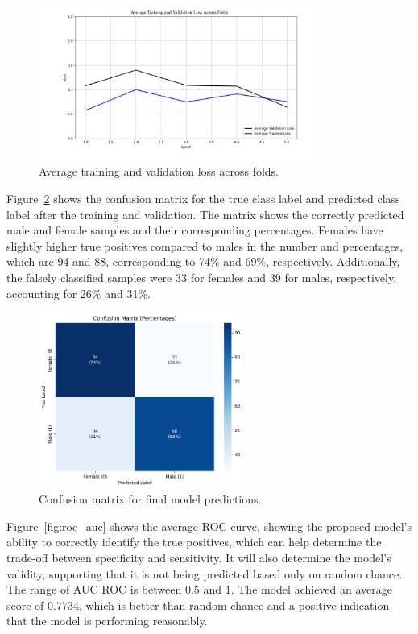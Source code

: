 \begin{figure}[!htbp]
	\centering
	\includegraphics[width=0.8\textwidth]{figures/avg_loss.png}
	\caption{Average training and validation loss across folds.}
	\label{fig:atvlaf}
\end{figure}

\newpage
Figure~\ref{fig:cm_dl} shows the confusion matrix for the true class label and predicted class label after the training and validation. The matrix shows the correctly predicted male and female samples and their corresponding percentages. Females have slightly higher true positives compared to males in the number and percentages, which are 94 and 88, corresponding to 74\% and 69\%, respectively. Additionally, the falsely classified samples were 33 for females and 39 for males, respectively, accounting for 26\% and 31\%.

\begin{figure}[!htbp]
	\centering
	\includegraphics[width=0.6\textwidth]{figures/cm_dl.png}
	\caption{Confusion matrix for final model predictions.}
	\label{fig:cm_dl}
\end{figure}

\newpage
Figure~\ref{fig:roc_auc} shows the average ROC curve, showing the proposed model’s ability to correctly identify the true positives, which can help determine the trade-off between specificity and sensitivity. It will also determine the model's validity, supporting that it is not being predicted based only on random chance. The range of AUC ROC is between 0.5 and 1. The model achieved an average score of 0.7734, which is better than random chance and a positive indication that the model is performing reasonably.


